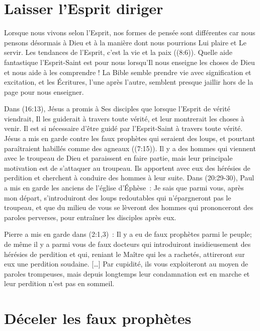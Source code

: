 \section{Laisser l'Esprit diriger}

Lorsque nous vivons selon l'Esprit, nos formes de pensée sont différentes
 car nous pensons désormais à Dieu et à la manière dont nous pourrions
 Lui plaire et Le servir.
 Les tendances de l'Esprit, c'est la vie et la paix ((8:6)).
 Quelle aide fantastique l'Esprit-Saint est pour nous lorsqu'Il nous enseigne
 les choses de Dieu et nous aide à les comprendre !
 La Bible semble prendre vie avec signification et excitation,
 et les Écritures, l'une après l'autre, semblent presque jaillir
 hors de la page pour nous enseigner.

\begin{specialpar}{}
Dans (16:13), Jésus a promis à Ses disciples
 que lorsque l'Esprit de vérité viendrait,
 Il les guiderait à travers toute vérité,
 et leur montrerait les choses à venir.
 Il est si nécessaire d'être guidé par l'Esprit-Saint
 à travers toute vérité.
 Jésus a mis en garde contre les faux prophètes qui seraient des loups,
 et pourtant paraîtraient habillés comme des agneaux ((7:15)).
 Il y a des hommes qui viennent avec le troupeau de Dieu
 et paraissent en faire partie, mais leur principale motivation
 est de s'attaquer au troupeau.
 Ils apportent avec eux des hérésies de perdition
 et cherchent à conduire des hommes à leur suite.
 Dans (20:29-30),
 Paul a mis en garde les anciens de l'église d'Éphèse~:
 \og Je sais que parmi vous, après mon départ,
 s'introduiront des loups redoutables
 qui n'épargneront pas le troupeau,
 et que du milieu de vous se lèveront des hommes
 qui prononceront des paroles perverses,
 pour entraîner les disciples après eux. \fg{}
\end{specialpar}

Pierre a mis en garde dans (2:1,3)~:
 \og Il y a eu de faux prophètes parmi le peuple;
 de même il y a parmi vous de faux docteurs
 qui introduiront insidieusement des hérésies de perdition et qui,
 reniant le Maître qui les a rachetés,
 attireront sur eux une perdition soudaine. [\dots{}]
 Par cupidité, ils vous exploiteront au moyen de paroles trompeuses,
 mais depuis longtemps leur condamnation est en marche
 et leur perdition n'est pas en sommeil. \fg{}


\section{D\'eceler les faux proph\`etes}

